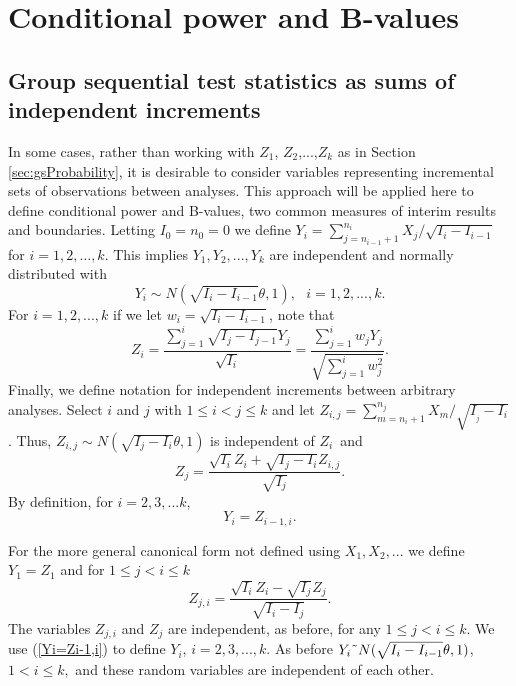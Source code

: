 \section{Conditional power and B-values\label{sec:CPB}}
\subsection{Group sequential test statistics as sums of independent increments\label{sec:increments}}
In some cases, rather than working with $Z_{1}$, $Z_{2}$,...,$Z_{k}$ as in Section \ref{sec:gsProbability}, it is desirable to consider
variables representing incremental sets of observations between analyses.
This approach will be applied here to define conditional power and B-values, two common measures of interim results and boundaries.
Letting $I_{0}=n_{0}=0$ we define $Y_{i}=\sum_{j=n_{i-1}+1}^{n_{i}}X_{j}%
/\sqrt{I_{i}-I_{i-1}}$ for $i=1,2,\ldots,k$. This implies $Y_{1}%
,Y_{2},...,Y_{k}$ are independent and normally distributed with
\begin{equation}
Y_{i}\sim N(\sqrt{I_{i}-I_{i-1}}\theta,1),\text{ }%
i=1,2,...,k.\label{Yi joint dist}%
\end{equation}
For $i=1,2,...,k$ if we let $w_{i}=\sqrt{I_{i}-I_{i-1}}$, note that
\begin{equation}
Z_{i}=\frac{\sum_{j=1}^{i}\sqrt{I_{j}-I_{j-1}}Y_{j}}{\sqrt{I_{i}}}=\frac
{\sum_{j=1}^{i}w_{j}Y_{j}}{\sqrt{\sum_{j=1}^{i}w_{j}^{2}}}%
.\label{Z sum of ind Y}%
\end{equation}
Finally, we define notation for independent increments between arbitrary
analyses. Select $i$ and $j$ with $1\leq i<j\leq k$ and let $Z_{i,j}%
=\sum_{m=n_{i}+1}^{n_{j}}X_{m}/\sqrt{I_{_{j}}-I_{i}}$. Thus, $Z_{i,j}\sim
N(\sqrt{I_{j}-I_{i}}\theta,1)$ is independent of $Z_{i}$\ and
\begin{equation}
Z_{j}=\frac{\sqrt{I_{i}}Z_{i}+\sqrt{I_{j}-I_{i}}Z_{i,j}}{\sqrt{I_{j}}%
}.\label{Zj as ind inc}
\end{equation}
By definition, for $i=2,3,...k$,
\begin{equation}
Y_{i}=Z_{i-1,i}.\label{Yi=Zi-1,i}%
\end{equation}
\bigskip

For the more general canonical form not defined using $X_{1},X_{2},...$ we
define $Y_{1}=Z_{1}$ and for $1\leq j<i\leq k$
\begin{equation}
Z_{j,i}=\frac{\sqrt{I_{i}}Z_{i}-\sqrt{I_{j}}Z_{j}}{\sqrt{I_{i}-I_{j}}%
}.\label{Zij implicit}%
\end{equation}
\bigskip The variables $Z_{j,i}$ and $Z_{j}$ are independent, as before, for
any $1\leq j<i\leq k$. We use (\ref{Yi=Zi-1,i}) to define $Y_{i}$,
$i=2,3,...,k.$ As before $Y_{i}\symbol{126}N(\sqrt{I_{i}-I_{i-1}}\theta,1)$,
$1<i\leq k,$ and these random variables are independent of each other.

